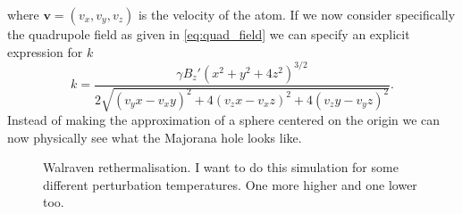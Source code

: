 where $\mathbf{v} = \left(v_x,v_y,v_z\right)$ is the velocity of the atom.
If we now consider specifically the quadrupole field as given in \autoref{eq:quad_field} we can specify an explicit expression for $k$
\begin{equation}
    k = \frac{\gamma  B_z' \left(x^2+y^2+4 z^2\right)^{3/2}}{2 \sqrt{(v_y x- v_x y)^2+4 (v_z x-v_x z)^2+4 (v_z y-v_y z)^2}}.
\end{equation}
Instead of making the approximation of a sphere centered on the origin we can now physically see what the Majorana hole looks like.
\begin{figure}
\hspace{-8em}
\caption{Walraven rethermalisation. I want to do this simulation for some different perturbation temperatures. One more higher and one lower too.}\label{fig:walravenTherm}
\end{figure}




